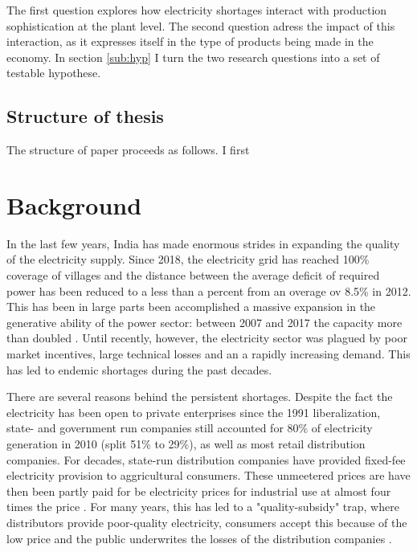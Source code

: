 \documentclass[11pt]{article}
\begin{document}
The first question explores how electricity shortages interact with production sophistication at the plant level. The second question adress the impact of this interaction, as it expresses itself in the type of products being made in the economy. In section \ref{sub:hyp} I turn the two research questions into a set of testable hypothese.

\subsection{Structure of thesis}%
\label{sub:structure_of_thesis}
The structure of paper proceeds as follows. I first 



\newpage
\section{Background}%
\label{sec:background}

In the last few years, India has made enormous strides in expanding the quality of the electricity supply. Since 2018, the electricity grid has reached 100\% coverage of villages and the distance between the average deficit of required power has been reduced to a less than a percent from an overage ov 8.5\% in 2012. This has been in large parts been accomplished a massive expansion in the generative ability of the power sector: between 2007 and 2017 the capacity more than doubled \citep{zhang_dark_2018}. Until recently, however, the electricity sector was plagued by poor market incentives, large technical losses and an a rapidly increasing demand. This has led to endemic shortages during the past decades.

There are several reasons behind the persistent shortages. Despite the fact the electricity has been open to private enterprises since the 1991 liberalization, state- and government run companies still accounted for 80\% of electricity generation in 2010 (split 51\% to 29\%), as well as most retail distribution companies. For decades, state-run distribution companies have provided fixed-fee electricity provision to aggricultural consumers. These unmeetered prices are have then been partly paid for be electricity prices for industrial use at almost four times the price \citep{allcott_how_2016}. For many years, this has led to a "quality-subsidy" trap, where distributors provide poor-quality electricity, consumers accept this because of the low price and the public underwrites the losses of the distribution companies \citep{mcrae_infrastructure_2015}. 
\end{document}

